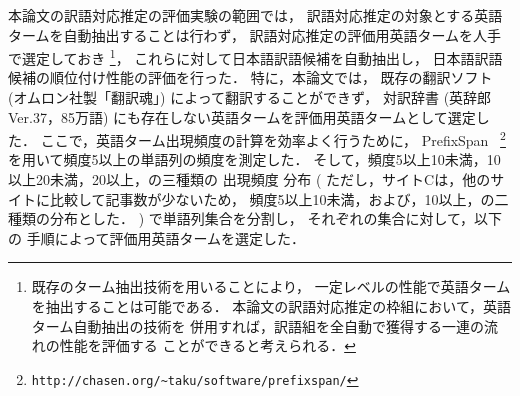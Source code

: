 本論文の訳語対応推定の評価実験の範囲では，
訳語対応推定の対象とする英語タームを自動抽出することは行わず，
訳語対応推定の評価用英語タームを人手で選定しておき
\footnote{
  既存のターム抽出技術を用いることにより，
  一定レベルの性能で英語タームを抽出することは可能である．
  本論文の訳語対応推定の枠組において，英語ターム自動抽出の技術を
  併用すれば，訳語組を全自動で獲得する一連の流れの性能を評価する
  ことができると考えられる．
}，
これらに対して日本語訳語候補を自動抽出し，
日本語訳語候補の順位付け性能の評価を行った．
特に，本論文では，
既存の翻訳ソフト
(オムロン社製「翻訳魂」)
によって翻訳することができず，
対訳辞書
(英辞郎Ver.37，85万語)
にも存在しない英語タームを評価用英語タームとして選定した．
ここで，英語ターム出現頻度の計算を効率よく行うために，
PrefixSpan~\cite{Pei01a}
\footnote{
    {\tt http://chasen.org/\~{}taku/software/prefixspan/}
}
を用いて頻度5以上の単語列の頻度を測定した．
そして，頻度5以上10未満，10以上20未満，20以上，の三種類の
出現頻度
分布
(
ただし，サイトCは，他のサイトに比較して記事数が少ないため，
頻度5以上10未満，および，10以上，の二種類の分布とした．
)
で単語列集合を分割し，
それぞれの集合に対して，以下の
手順によって評価用英語タームを選定した．


